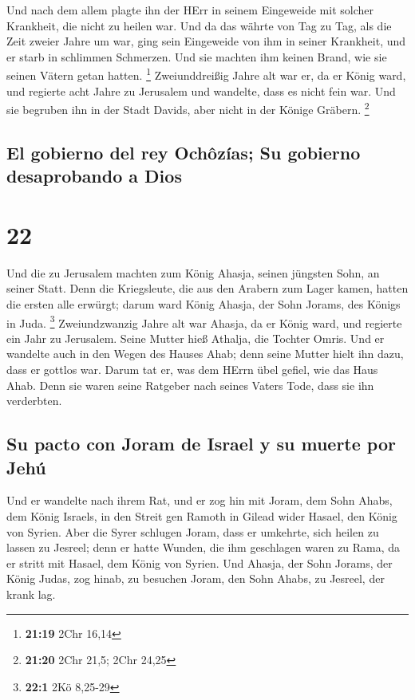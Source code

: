  Und nach dem allem plagte ihn der HErr in seinem
Eingeweide mit solcher Krankheit, die nicht zu heilen war.
 Und da das währte von Tag zu Tag, als die Zeit zweier
Jahre um war, ging sein Eingeweide von ihm in seiner Krankheit, und er
starb in schlimmen Schmerzen. Und sie machten ihm keinen Brand, wie sie
seinen Vätern getan hatten. \footnote{\textbf{21:19} 2Chr 16,14}
 Zweiunddreißig Jahre alt war er, da er König ward, und
regierte acht Jahre zu Jerusalem und wandelte, dass es nicht fein war.
Und sie begruben ihn in der Stadt Davids, aber nicht in der Könige
Gräbern. \footnote{\textbf{21:20} 2Chr 21,5; 2Chr 24,25}

\hypertarget{el-gobierno-del-rey-ochuxf4zuxedas-su-gobierno-desaprobando-a-dios}{%
\subsection{El gobierno del rey Ochôzías; Su gobierno desaprobando a
Dios}\label{el-gobierno-del-rey-ochuxf4zuxedas-su-gobierno-desaprobando-a-dios}}

\hypertarget{section-21}{%
\section{22}\label{section-21}}

 Und die zu Jerusalem machten zum König Ahasja, seinen
jüngsten Sohn, an seiner Statt. Denn die Kriegsleute, die aus den
Arabern zum Lager kamen, hatten die ersten alle erwürgt; darum ward
König Ahasja, der Sohn Jorams, des Königs in Juda. \footnote{\textbf{22:1}
  2Kö 8,25-29}  Zweiundzwanzig Jahre alt war Ahasja, da er
König ward, und regierte ein Jahr zu Jerusalem. Seine Mutter hieß
Athalja, die Tochter Omris.  Und er wandelte auch in den
Wegen des Hauses Ahab; denn seine Mutter hielt ihn dazu, dass er gottlos
war.  Darum tat er, was dem HErrn übel gefiel, wie das
Haus Ahab. Denn sie waren seine Ratgeber nach seines Vaters Tode, dass
sie ihn verderbten.

\hypertarget{su-pacto-con-joram-de-israel-y-su-muerte-por-jehuxfa}{%
\subsection{Su pacto con Joram de Israel y su muerte por
Jehú}\label{su-pacto-con-joram-de-israel-y-su-muerte-por-jehuxfa}}

 Und er wandelte nach ihrem Rat, und er zog hin mit Joram,
dem Sohn Ahabs, dem König Israels, in den Streit gen Ramoth in Gilead
wider Hasael, den König von Syrien. Aber die Syrer schlugen Joram,
 dass er umkehrte, sich heilen zu lassen zu Jesreel; denn
er hatte Wunden, die ihm geschlagen waren zu Rama, da er stritt mit
Hasael, dem König von Syrien. Und Ahasja, der Sohn Jorams, der König
Judas, zog hinab, zu besuchen Joram, den Sohn Ahabs, zu Jesreel, der
krank lag.

